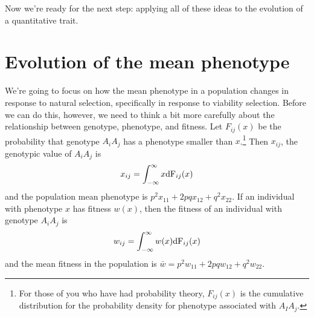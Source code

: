 Now we're ready for the next step: applying all of these ideas to the
evolution of a quantitative trait.

\section*{Evolution of the mean phenotype}

We're going to focus on how the mean phenotype in a population changes
in response to natural selection, specifically in response to
viability selection.  Before we can do this, however, we need to think
a bit more carefully about the relationship between genotype,
phenotype, and fitness.  Let $F_{ij}(x)$ be the probability that
genotype $A_iA_j$ has a phenotype smaller than $x$.\footnote{For those
of you who have had probability theory, $F_{ij}(x)$ is the cumulative
distribution for the probability density for phenotype associated with
$A_IA_j$.} Then $x_{ij}$, the genotypic value of $A_iA_j$
is
\[
x_{ij} = \int_{-\infty}^\infty x \mbox{\rm dF}_{ij}(x)
\]
and the population mean phenotype is $p^2x_{11} + 2pqx_{12} +
q^2x_{22}$.  If an individual with phenotype $x$ has fitness $w(x)$,
then the fitness of an individual with genotype $A_iA_j$
is
\[
w_{ij} = \int_{-\infty}^\infty w(x) \mbox{\rm dF}_{ij}(x)
\]
and the mean fitness in the population is $\bar w = p^2w_{11} +
2pqw_{12} + q^2w_{22}$.

